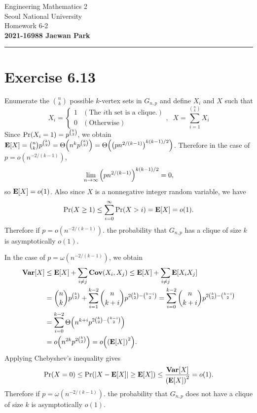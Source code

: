 \documentclass{article}
\begin{document}
\vspace*{-1.5cm}
{\centering \vbox{%
\vspace{2mm}
\large
Engineering Mathematics 2 \hfill
\\
Seoul National University
\\[4mm]
Homework 6-2\\
\textbf{2021-16988 Jaewan Park} \\[0.8mm]
}}
\par\noindent\rule{\textwidth}{0.5pt}

\section*{Exercise 6.13}
Enumerate the ${n \choose k}$ possible $k$-vertex sets in $G_{n, p}$ and define $X_i$ and $X$ such that
$$X_i = \begin{cases}
    1 & (\text{The }i\text{th set is a clique.}) \\
    0 & (\text{Otherwise})
\end{cases}, \;\; X = \sum_{i=1}^{{n \choose k}}X_i$$
Since $\mathrm{Pr}\qty(X_i=1) = p^{{k \choose 2}}$, we obtain $\mathbf{E}\qty[X] = {n \choose k}p^{{k \choose 2}} = \Theta\qty(n^kp^{{k \choose 2}}) = \Theta\qty(\qty(pn^{2/(k-1)})^{k(k-1)/2})$.
Therefore in the case of $p = o(n^{-2/(k-1)})$,
$$\lim_{n \to \infty}\qty(pn^{2/(k-1)})^{k(k-1)/2} = 0,$$
so $\mathbf{E}\qty[X] = o(1)$.
Also since $X$ is a nonnegative integer random variable, we have
$$\mathrm{Pr}\qty(X \geq 1) \leq \sum_{i=0}^{\infty}\mathrm{Pr}\qty(X > i) = \mathbf{E}\qty[X] = o(1).$$
Therefore if $p = o(n^{-2/(k-1)})$. the probability that $G_{n, p}$ has a clique of size $k$ is asymptotically $o(1)$.

\vspace{2mm}
In the case of $p = \omega(n^{-2/(k-1)})$, we obtain
\begin{align*}
    \mathbf{Var}\qty[X] &\leq \mathbf{E}\qty[X] + \sum_{i \neq j}\mathbf{Cov}\qty(X_i, X_j) \leq \mathbf{E}\qty[X] + \sum_{i \neq j}\mathbf{E}\qty[X_i X_j] \\
    &= {n \choose k}p^{{k \choose 2}} + \sum_{i=1}^{k-2}{n \choose k+i}p^{2{k \choose 2} - {k - i \choose 2}} = \sum_{i=0}^{k-2}{n \choose k+i}p^{2{k \choose 2} - {k - i \choose 2}} \\
    &= \sum_{i=0}^{k-2}\Theta\qty(n^{k+i}p^{2{k \choose 2} - {k - i \choose 2}}) \\
    &= o\qty(n^{2k}p^{2{k \choose 2}}) = o\qty(\qty(\mathbf{E}\qty[X])^2).
\end{align*}
Applying Chebyshev's inequality gives
$$\mathrm{Pr}\qty(X = 0) \leq \mathrm{Pr}\qty(\qty|X - \mathbf{E}\qty[X]| \geq \mathbf{E}\qty[X]) \leq \frac{\mathbf{Var}\qty[X]}{\qty(\mathbf{E}\qty[X])^2} = o(1).$$
Therefore if $p = \omega(n^{-2/(k-1)})$. the probability that $G_{n, p}$ does not have a clique of size $k$ is asymptotically $o(1)$.
\end{document}
